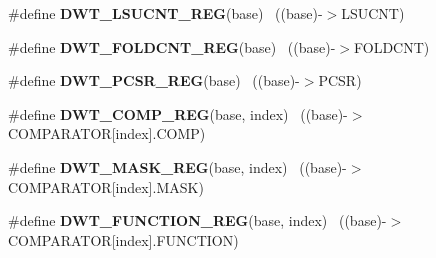 \begin{DoxyCompactItemize}
\item 
\hypertarget{group___d_w_t___register___accessor___macros_ga1b22a818a9d093362624b64053cd8b6d}{}\#define {\bfseries D\+W\+T\+\_\+\+L\+S\+U\+C\+N\+T\+\_\+\+R\+E\+G}(base)                                      ~((base)-\/$>$L\+S\+U\+C\+N\+T)\label{group___d_w_t___register___accessor___macros_ga1b22a818a9d093362624b64053cd8b6d}

\item 
\hypertarget{group___d_w_t___register___accessor___macros_gaeb8e407cb620f678d367fae5467d486a}{}\#define {\bfseries D\+W\+T\+\_\+\+F\+O\+L\+D\+C\+N\+T\+\_\+\+R\+E\+G}(base)                                    ~((base)-\/$>$F\+O\+L\+D\+C\+N\+T)\label{group___d_w_t___register___accessor___macros_gaeb8e407cb620f678d367fae5467d486a}

\item 
\hypertarget{group___d_w_t___register___accessor___macros_ga19fcf102babeb34ec17bc96dd4d08e52}{}\#define {\bfseries D\+W\+T\+\_\+\+P\+C\+S\+R\+\_\+\+R\+E\+G}(base)                                          ~((base)-\/$>$P\+C\+S\+R)\label{group___d_w_t___register___accessor___macros_ga19fcf102babeb34ec17bc96dd4d08e52}

\item 
\hypertarget{group___d_w_t___register___accessor___macros_gad03eebac5bf5c3c3e461e156ba6e37ae}{}\#define {\bfseries D\+W\+T\+\_\+\+C\+O\+M\+P\+\_\+\+R\+E\+G}(base,  index)                              ~((base)-\/$>$C\+O\+M\+P\+A\+R\+A\+T\+O\+R\mbox{[}index\mbox{]}.C\+O\+M\+P)\label{group___d_w_t___register___accessor___macros_gad03eebac5bf5c3c3e461e156ba6e37ae}

\item 
\hypertarget{group___d_w_t___register___accessor___macros_ga16461875f56f3b91ee27a53a9f4dbc78}{}\#define {\bfseries D\+W\+T\+\_\+\+M\+A\+S\+K\+\_\+\+R\+E\+G}(base,  index)                              ~((base)-\/$>$C\+O\+M\+P\+A\+R\+A\+T\+O\+R\mbox{[}index\mbox{]}.M\+A\+S\+K)\label{group___d_w_t___register___accessor___macros_ga16461875f56f3b91ee27a53a9f4dbc78}

\item 
\hypertarget{group___d_w_t___register___accessor___macros_gaedc0f311fdf85789a988b58375481265}{}\#define {\bfseries D\+W\+T\+\_\+\+F\+U\+N\+C\+T\+I\+O\+N\+\_\+\+R\+E\+G}(base,  index)                      ~((base)-\/$>$C\+O\+M\+P\+A\+R\+A\+T\+O\+R\mbox{[}index\mbox{]}.F\+U\+N\+C\+T\+I\+O\+N)\label{group___d_w_t___register___accessor___macros_gaedc0f311fdf85789a988b58375481265}


\end{DoxyCompactItemize}
